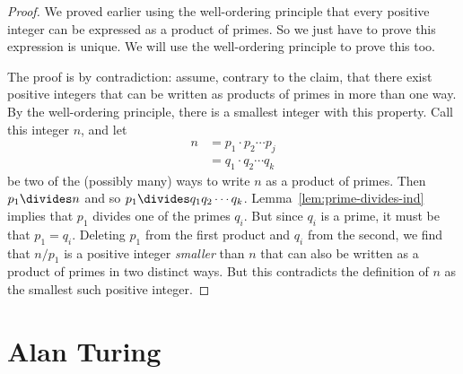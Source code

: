 \begin{proof}
We proved earlier using the well-ordering principle that every positive
integer can be expressed as a product of primes.  So we just have to prove
this expression is unique.  We will use the well-ordering principle to
prove this too.

The proof is by contradiction: assume, contrary to the claim, that there
exist positive integers that can be written as products of primes in more
than one way.  By the well-ordering principle, there is a smallest integer
with this property.  Call this integer $n$, and let
%
\begin{align*}
n & = p_1 \cdot p_2 \cdots p_j \\
  & = q_1 \cdot q_2 \cdots q_k
\end{align*}
%
be two of the (possibly many) ways to write $n$ as a product of
primes.  Then $p_1 \divides n$ and so $p_1 \divides q_1 q_2 \cdots q_k$.
Lemma~\ref{lem:prime-divides-ind} implies that $p_1$ divides one of
the primes $q_i$.  But since $q_i$ is a prime, it must be that $p_1 =
q_i$.  Deleting $p_1$ from the first product and $q_i$ from the
second, we find that $n / p_1$ is a positive integer \emph{smaller}
than $n$ that can also be written as a product of primes in two
distinct ways.  But this contradicts the definition of $n$ as the
smallest such positive integer.
\end{proof}

\begin{problems}
\classproblems
{}
\end{problems}

\section{Alan Turing}\label{Turing_sec}

